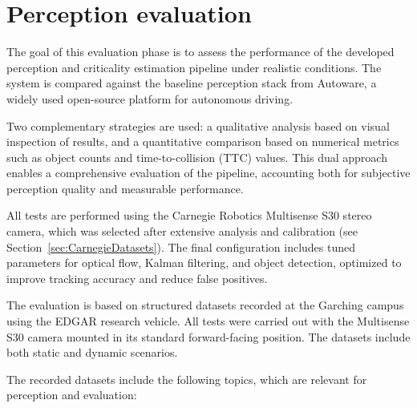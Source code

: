 \section{Perception evaluation}\label{sec:PerceptionEvaluation}

The goal of this evaluation phase is to assess the performance of the 
developed perception and criticality estimation pipeline under realistic 
conditions. The system is compared against the baseline perception stack 
from Autoware, a widely used open-source platform for autonomous 
driving.

Two complementary strategies are used: a qualitative analysis based on 
visual inspection of results, and a quantitative comparison based on 
numerical metrics such as object counts and time-to-collision (TTC) 
values. This dual approach enables a comprehensive evaluation of the 
pipeline, accounting both for subjective perception quality and 
measurable performance.

All tests are performed using the Carnegie Robotics Multisense S30 
stereo camera, which was selected after extensive analysis and 
calibration (see Section~\ref{sec:CarnegieDatasets}). The final 
configuration includes tuned parameters for optical flow, Kalman 
filtering, and object detection, optimized to improve tracking accuracy 
and reduce false positives.

The evaluation is based on structured datasets recorded at the Garching 
campus using the EDGAR research vehicle. All tests were carried out 
with the Multisense S30 camera mounted in its standard forward-facing 
position. The datasets include both static and dynamic scenarios.

The recorded datasets include the following topics, which are
relevant for perception and evaluation:

